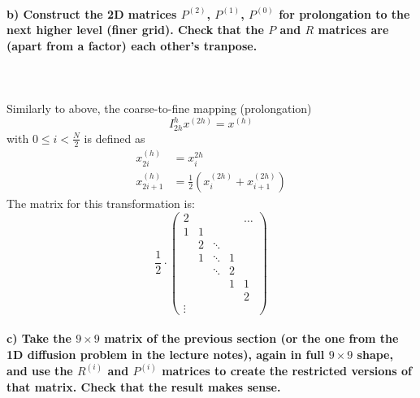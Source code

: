 \paragraph{
    b) Construct the 2D matrices $P^{(2)}$, $P^{(1)}$, $P^{(0)}$ 
    for 
    prolongation to the next higher level (finer grid). Check that 
    the $P$ and $R$ matrices are (apart from a factor) each other’s 
    tranpose.
} \ \\
    \\
    Similarly to above, the coarse-to-fine mapping (prolongation)
    \begin{equation}
        I_{2h}^h x^{(2h)}=x^{(h)}
    \end{equation}
    with $0\leq i<\frac{N}{2}$ is defined as
    \begin{align}
            x_{2i}^{(h)}
            &=x_i^{2h} \\
            x_{2i+1}^{(h)}
            &=\frac{1}{2}(x_i^{(2h)}+x_{i+1}^{(2h)})
    \end{align}
    The matrix for this transformation is:
    \begin{equation}
        \frac{1}{2}\cdot
        \begin{pmatrix}
            2      &   &        &   & \hdots \\
            1      & 1 &        &   &        \\
                   & 2 & \ddots &   &        \\
                   & 1 & \ddots & 1 &        \\
                   &   & \ddots & 2 &        \\
                   &   &        & 1 & 1      \\
                   &   &        &   & 2      \\
            \vdots
        \end{pmatrix}
    \end{equation}


\paragraph{
    c) Take the $9\times9$ matrix of the previous section (or the one 
    from the 1D diffusion problem in the lecture notes), again in full 
    $9\times9$ shape, and use the $R^{(i)}$ and $P^{(i)}$ matrices to 
    create the restricted versions of that matrix. 
    Check that the result makes sense.
} \ \\
    \\

